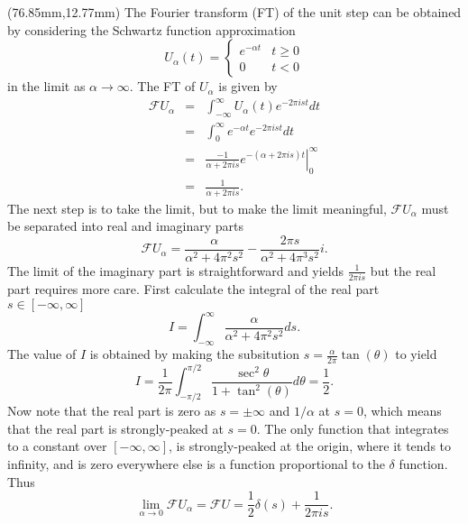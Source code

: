 \scriptsize
{}
\begin{textblock*}{75mm}(76.85mm,12.77mm)
The Fourier transform (FT) of the unit step can be obtained by considering
the Schwartz function approximation
\begin{equation}
  U_{\alpha}(t) = \left\{ \begin{array}{cc} e^{-\alpha t} & t \geq 0 \\ 0 & t < 0 \end{array} \right.  
\end{equation}
in the limit as $\alpha \rightarrow \infty$.
The FT of $U_{\alpha}$ is given by
\begin{eqnarray}
{\mathcal F} U_{\alpha} & = & \int_{-\infty}^{\infty} U_{\alpha}(t) e^{-2 \pi i s t} dt \\ \nonumber
                        & = & \int_{0}^{\infty} e^{-\alpha t} e^{-2 \pi i s t} dt \\ \nonumber
                        & = & \left. \frac{-1}{\alpha + 2 \pi i s} e^{-(\alpha + 2 \pi i s) t}  \right|_{0}^{\infty} \\ \nonumber
                        & = & \frac{1}{\alpha + 2 \pi i s}.
\end{eqnarray}
The next step is to take the limit, but to make the limit meaningful, ${\mathcal F}U_{\alpha}$ must
be separated into real and imaginary parts
\begin{equation}
  {\mathcal F} U_{\alpha} = \frac{\alpha}{\alpha^2 + 4 \pi^2 s^2} - \frac{2 \pi s}{\alpha^2 + 4 \pi^3 s^2} i.
\end{equation}
The limit of the imaginary part is straightforward and yields $\frac{1}{2 \pi i s}$ but the real
part requires more care.  First calculate the integral of the real part $s \in [-\infty,\infty]$
\begin{equation}
I =  \int_{-\infty}^{\infty} \frac{\alpha}{\alpha^2 + 4 \pi^2 s^2} ds .
\end{equation}
The value of $I$ is obtained by making the subsitution $s = \frac{\alpha}{2 \pi} \tan(\theta)$ to yield
\[
  I = \frac{1}{2 \pi} \int_{-\pi/2}^{\pi/2} \frac{ \sec^2{\theta} }{1 + \tan^2(\theta)} d \theta = \frac{1}{2} .
\]
Now note that the real part is zero as $s = \pm \infty$ and $1/\alpha$ at $s=0$, which means that the real part
is strongly-peaked at $s=0$.  The only function that integrates to a constant over $[-\infty,\infty]$, is 
strongly-peaked at the origin, where it tends to infinity, and is zero everywhere else is a function
proportional to the $\delta$ function.  Thus
\begin{equation}
 \lim_{\alpha \rightarrow 0} {\mathcal F} U_{\alpha} = {\mathcal F}U = \frac{1}{2} \delta(s) + \frac{1}{2 \pi i s} .
\end{equation}
\end{textblock*}
\newpage